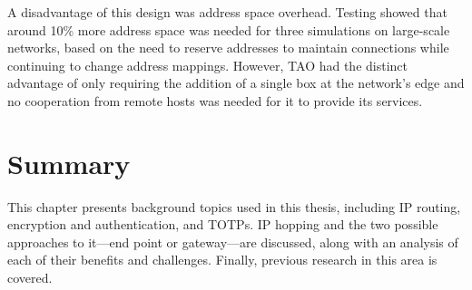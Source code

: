 \par A disadvantage of this design was address space overhead. Testing showed that around 10\% more address space was needed for three simulations on large-scale networks, based on the need to reserve addresses to maintain connections while continuing to change address mappings. However, TAO had the distinct advantage of only requiring the addition of a single box at the network's edge and no cooperation from remote hosts was needed for it to provide its services.


\section{Summary}
\label{sec:background_summary}
\par This chapter presents background topics used in this thesis, including \ac{IP} routing, encryption and authentication, and \aclp{TOTP}. \ac{IP} hopping and the two possible approaches to it---end point or gateway---are discussed, along with an analysis of each of their benefits and challenges. Finally, previous research in this area is covered.

